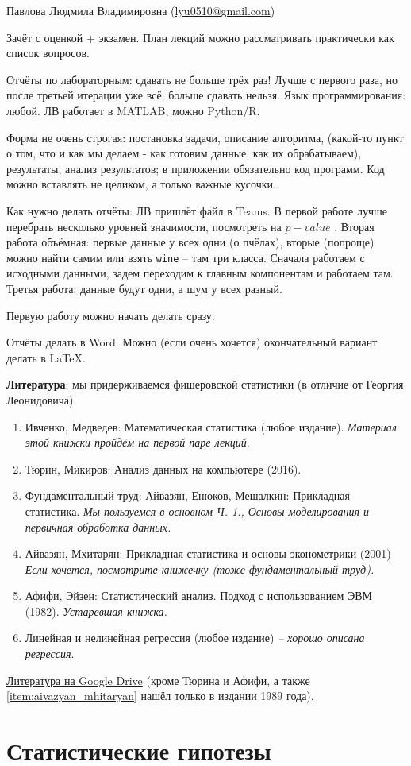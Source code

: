 \documentclass[a4paper,12pt]{report}
\begin{document}
	
    \tableofcontents
    \newpage

    Павлова Людмила Владимировна (\href{mailto:lyu0510@gmail.com}{lyu0510@gmail.com})

    Зачёт с оценкой + экзамен. План лекций можно рассматривать практически как список вопросов.

    Отчёты по лабораторным: сдавать не больше трёх раз!
    Лучше с первого раза, но после третьей итерации уже всё, больше сдавать нельзя.
    Язык программирования: любой.
    ЛВ работает в MATLAB, можно Python/R.

    Форма не очень строгая: постановка задачи, описание алгоритма, (какой-то пункт о том, что и как мы делаем - как готовим данные, как их обрабатываем), результаты, анализ результатов; в приложении обязательно код программ.
    Код можно вставлять не целиком, а только важные кусочки.

    Как нужно делать отчёты: ЛВ пришлёт файл в Teams.
    В первой работе лучше перебрать несколько уровней значимости, посмотреть на $ p-value $ .
    Вторая работа объёмная: первые данные у всех одни (о пчёлах), вторые (попроще) можно найти самим или взять \texttt{wine} -- там три класса.
    Сначала работаем с исходными данными, задем переходим к главным компонентам и работаем там.
    Третья работа: данные будут одни, а шум у всех разный.

    Первую работу можно начать делать сразу.

    Отчёты делать в Word\texttrademark.
    Можно (если очень хочется) окончательный вариант делать в \LaTeX.

    \textbf{Литература}: мы придерживаемся фишеровской статистики (в отличие от Георгия Леонидовича).
    \begin{enumerate}[noitemsep]
        \item Ивченко, Медведев: Математическая статистика (любое издание). \emph{Материал этой книжки пройдём на первой паре лекций}.
        \item Тюрин, Микиров: Анализ данных на компьютере (2016).
        \item Фундаментальный труд: Айвазян, Енюков, Мешалкин: Прикладная статистика.
        \emph{Мы пользуемся в основном Ч. 1., Основы моделирования и первичная обработка данных.}
        \item Айвазян, Мхитарян: Прикладная статистика и основы эконометрики (2001) \emph{Если хочется, посмотрите книжечку (тоже фундаментальный труд).} \label{item:aivazyan_mhitaryan}
        \item Афифи, Эйзен: Статистический анализ. Подход с использованием ЭВМ (1982). \emph{Устаревшая книжка.}
        \item Линейная и нелинейная регрессия (любое издание) \emph{-- хорошо описана регрессия}.
    \end{enumerate}

    \href{https://drive.google.com/drive/folders/18WM37ML5G8PERAv0esU2HV9sqEgyejj0?usp=sharing}{Литература на Google Drive} (кроме Тюрина и Афифи, а также \ref{item:aivazyan_mhitaryan} нашёл только в издании 1989 года).

    \chapter{Статистические гипотезы}
    
\end{document}
